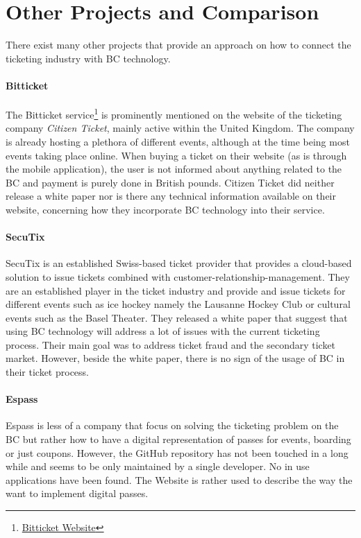 \section{Other Projects and Comparison}

There exist many other projects that provide an approach on how to connect the ticketing industry with BC technology.

\paragraph{Bitticket}
The Bitticket service\footnote{\href{https://www.bitticket.io}{Bitticket Website}} is prominently mentioned on the website of the ticketing company \textit{Citizen Ticket}, mainly active within the United Kingdom. The company is already hosting a plethora of different events, although at the time being most events taking place online. When buying a ticket on their website (as is through the mobile application), the user is not informed about anything related to the BC and payment is purely done in British pounds. Citizen Ticket did neither release a white paper nor is there any technical information available on their website, concerning how they incorporate BC technology into their service.

\paragraph{SecuTix}
SecuTix \cite{SECUTIX} is an established Swiss-based ticket provider that provides a cloud-based solution to issue tickets combined with customer-relationship-management. They are an established player in the ticket industry and provide and issue tickets for different events such as ice hockey namely the Lausanne Hockey Club or cultural events such as the Basel Theater. They released a white paper that suggest that using BC technology will address a lot of issues with the current ticketing process. Their main goal was to address ticket fraud and the secondary ticket market. However, beside the white paper, there is no sign of the usage of BC in their ticket process.

\paragraph{Espass} 
Espass \cite{espass} is less of a company that focus on solving the ticketing problem on the BC but rather how to have a digital representation of passes for events, boarding or just coupons. However, the GitHub repository has not been touched in a long while and seems to be only maintained by a single developer. No in use applications have been found. The Website is rather used to describe the way the want to implement digital passes.  


